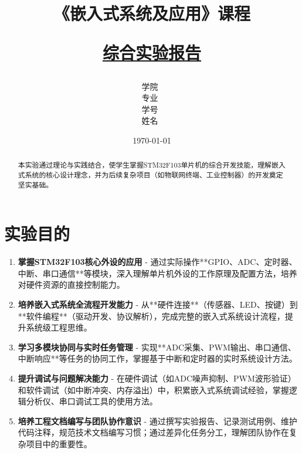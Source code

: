 \documentclass[12pt,hyperref,a4paper,twoside,UTF8]{ctexart}
\title{ 
        \vspace{1cm}
        \heiti \Huge \textbf{《嵌入式系统及应用》课程} \par
        \vspace{1cm} 
        \heiti \Large {\underline{综合实验报告}}    
        \vspace{3cm}
    }
\author{
        \vspace{0.5cm}
        \kaishu\Large 学院\ \dlmu[9cm]{仪器科学与光电工程学院} \\ %
        \vspace{0.5cm}
        \kaishu\Large 专业\ \dlmu[9cm]{光电信息工程} \\ %
        \vspace{0.5cm}
        \kaishu\Large 学号\ \dlmu[9cm]{2024XXXXXX} \qquad  \\ %
        \vspace{0.5cm}
        \kaishu\Large 姓名\ \dlmu[9cm]{XXX} \qquad \\ %
    }
\date{\today} %
\begin{document}
\cover
\thispagestyle{empty} %
\newpage
\begin{abstract}

本实验通过理论与实践结合，使学生掌握STM32F103单片机的综合开发技能，理解嵌入式系统的核心设计理念，并为后续复杂项目（如物联网终端、工业控制器）的开发奠定坚实基础。

\end{abstract}

\thispagestyle{empty} %

\newpage
\tableofcontents

\newpage
\setcounter{page}{1} %


\section{实验目的}


\begin{enumerate}[label=\roman*.]


\item \textbf{掌握STM32F103核心外设的应用}   - 通过实际操作**GPIO、ADC、定时器、中断、串口通信**等模块，深入理解单片机外设的工作原理及配置方法，培养对硬件资源的直接控制能力。

\item \textbf{培养嵌入式系统全流程开发能力}   - 从**硬件连接**（传感器、LED、按键）到**软件编程**（驱动开发、协议解析），完成完整的嵌入式系统设计流程，提升系统级工程思维。

\item \textbf{学习多模块协同与实时任务管理}    - 实现**ADC采集、PWM输出、串口通信、中断响应**等任务的协同工作，掌握基于中断和定时器的实时系统设计方法。

\item \textbf{提升调试与问题解决能力}    - 在硬件调试（如ADC噪声抑制、PWM波形验证）和软件调试（如中断冲突、内存溢出）中，积累嵌入式系统调试经验，掌握逻辑分析仪、串口调试工具的使用方法。

\item \textbf{培养工程文档编写与团队协作意识}    - 通过撰写实验报告、记录测试用例、维护代码注释，规范技术文档编写习惯；通过差异化任务分工，理解团队协作在复杂项目中的重要性。

\end{enumerate}
\end{document}
